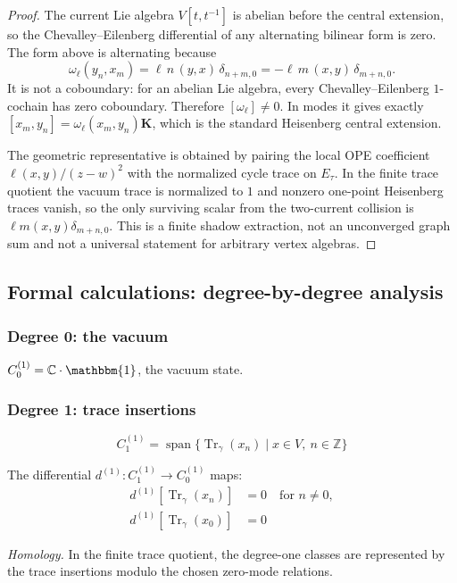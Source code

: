 \begin{proof}
The current Lie algebra $V[t,t^{-1}]$ is abelian before the central
extension, so the Chevalley--Eilenberg differential of any alternating
bilinear form is zero. The form above is alternating because
\[
\omega_\ell(y_n,x_m)
 =\ell\,n\,(y,x)\,\delta_{n+m,0}
 =-\ell\,m\,(x,y)\,\delta_{m+n,0}.
\]
It is not a coboundary: for an abelian Lie algebra, every
Chevalley--Eilenberg $1$-cochain has zero coboundary. Therefore
$[\omega_\ell]\neq 0$. In modes it gives exactly
$[x_m,y_n]=\omega_\ell(x_m,y_n)\mathbf K$, which is the standard
Heisenberg central extension.

The geometric representative is obtained by pairing the local OPE
coefficient $\ell(x,y)/(z-w)^2$ with the normalized cycle trace on
$E_\tau$. In the finite trace quotient the vacuum trace is normalized to
$1$ and nonzero one-point Heisenberg traces vanish, so the only surviving
scalar from the two-current collision is
$\ell m(x,y)\delta_{m+n,0}$. This is a finite shadow extraction, not an
unconverged graph sum and not a universal statement for arbitrary vertex
algebras.
\end{proof}

\subsection{Formal calculations: degree-by-degree analysis}

\subsubsection{Degree 0: the vacuum}

$C_0^{(1)} = \mathbb{C} \cdot \mathbbm{1}$, the vacuum state.

\subsubsection{Degree 1: trace insertions}

\[C_1^{(1)} = \operatorname{span}\{ \operatorname{Tr}_\gamma(x_n) \mid x\in V,\ n \in \mathbb{Z} \}\]

The differential $d^{(1)}: C_1^{(1)} \to C_0^{(1)}$ maps:
\begin{align}
d^{(1)}[\operatorname{Tr}_\gamma(x_n)] &= 0 \quad \text{for } n \neq 0, \\
d^{(1)}[\operatorname{Tr}_\gamma(x_0)] &= 0
\end{align}

\emph{Homology.} In the finite trace quotient, the degree-one classes are
represented by the trace insertions modulo the chosen zero-mode
relations.

